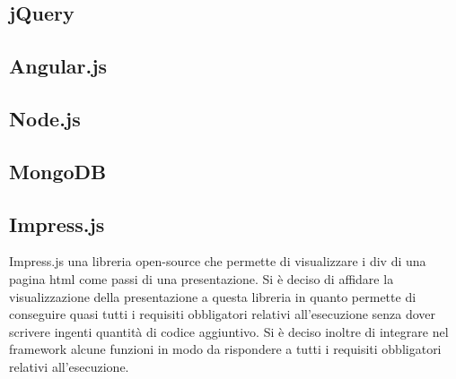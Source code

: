 \subsection{jQuery}

\subsection{Angular.js}
\subsection{Node.js}
\subsection{MongoDB}
\subsection{Impress.js}
Impress.js una libreria open-source che permette di visualizzare i div di una pagina html come passi di una presentazione. Si è deciso di affidare la visualizzazione della presentazione a questa libreria in quanto permette di conseguire quasi tutti i requisiti obbligatori relativi all’esecuzione senza dover scrivere ingenti quantità di codice aggiuntivo.
Si è deciso inoltre di integrare nel framework alcune funzioni in modo da rispondere a tutti i requisiti obbligatori relativi all’esecuzione.

